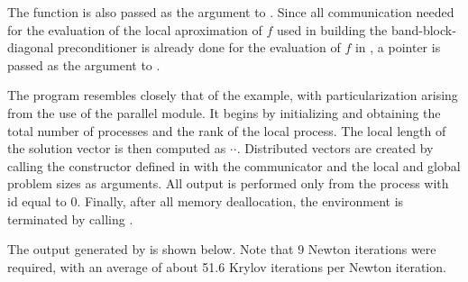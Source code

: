 The function  is also passed as the  argument to 
. Since all communication needed for the evaluation of the
local aproximation of $f$ used in building the band-block-diagonal preconditioner
is already done for the evaluation of $f$ in , a  pointer is
passed as the  argument to .

The  program resembles closely that of the  example, with
particularization arising from the use of the parallel {\mpi} {\nvecp} module.
It begins by initializing {\mpi} and obtaining the total number of processes and 
the rank of the local process. The local length of the solution vector is then 
computed as $\cdot$$\cdot$.
Distributed vectors are created by calling the constructor defined in {\nvecp}
with the {\mpi} communicator and the local and global problem sizes as arguments.
All output is performed only from the process with id equal to $0$.
Finally, after all memory deallocation, the {\mpi} environment is terminated by
calling .

The output generated by  is shown below.  Note that 9 Newton
iterations were required, with an average of about 51.6 Krylov iterations
per Newton iteration.



